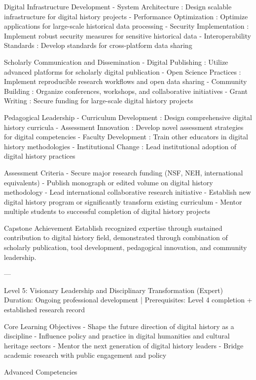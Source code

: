 \begin{appendices}
     Digital Infrastructure Development
-  System Architecture : Design scalable infrastructure for digital history projects
-  Performance Optimization : Optimize applications for large-scale historical data processing
-  Security Implementation : Implement robust security measures for sensitive historical data
-  Interoperability Standards : Develop standards for cross-platform data sharing

     Scholarly Communication and Dissemination
-  Digital Publishing : Utilize advanced platforms for scholarly digital publication
-  Open Science Practices : Implement reproducible research workflows and open data sharing
-  Community Building : Organize conferences, workshops, and collaborative initiatives
-  Grant Writing : Secure funding for large-scale digital history projects

    Pedagogical Leadership
-  Curriculum Development : Design comprehensive digital history curricula
-  Assessment Innovation : Develop novel assessment strategies for digital competencies
-  Faculty Development : Train other educators in digital history methodologies
-  Institutional Change : Lead institutional adoption of digital history practices

    Assessment Criteria
- Secure major research funding (NSF, NEH, international equivalents)
- Publish monograph or edited volume on digital history methodology
- Lead international collaborative research initiative
- Establish new digital history program or significantly transform existing curriculum
- Mentor multiple students to successful completion of digital history projects

    Capstone Achievement
Establish recognized expertise through sustained contribution to digital history field, demonstrated through combination of scholarly publication, tool development, pedagogical innovation, and community leadership.

---

   Level 5: Visionary Leadership and Disciplinary Transformation (Expert)
 Duration: Ongoing professional development | Prerequisites: Level 4 completion + established research record 

    Core Learning Objectives
- Shape the future direction of digital history as a discipline
- Influence policy and practice in digital humanities and cultural heritage sectors
- Mentor the next generation of digital history leaders
- Bridge academic research with public engagement and policy

    Advanced Competencies


\end{appendices}
